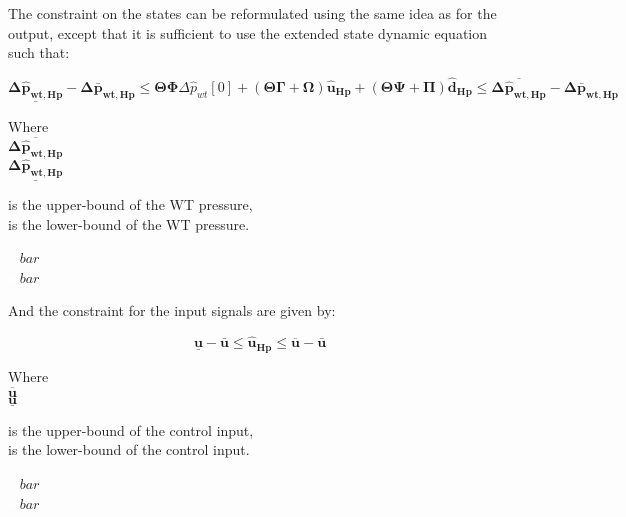 

The constraint on the states can be reformulated using the same idea as for the output, except that it is sufficient to use the extended state dynamic equation such that: 

\begin{equation}
	\underline{\bm{\Delta \hat{p}_{wt,Hp}}} - \bm{\Delta \bar{p}_{wt,Hp}} \leq \bm{\Theta} \bm{\Phi} \Delta \hat{p}_{wt}[0] +  (\bm{\Theta} \bm{\Gamma}+  \bm{\Omega}) \bm{\hat{u}_{Hp}} + (\bm{\Theta} \bm{\Psi} + \bm{\Pi})  \bm{\hat{d}_{Hp}} \leq \overline{\bm{\Delta \hat{p}_{wt,Hp}}} - \bm{\Delta \bar{p}_{wt,Hp}} 
	\label{eq:stateconstraint}
\end{equation}

\begin{minipage}[t]{0.20\textwidth}
Where\\
\hspace*{8mm} $ \overline{\bm{\Delta \hat{p}_{wt,Hp}}} $ \\
\hspace*{8mm} $ \underline{\bm{\Delta \hat{p}_{wt,Hp}}} $ 
\end{minipage}
\begin{minipage}[t]{0.68\textwidth}
\vspace*{2mm}
is the upper-bound of the WT pressure, \\
is the lower-bound of the WT pressure. 
\end{minipage}
\begin{minipage}[t]{0.10\textwidth}
\vspace*{1.8mm}
\textcolor{White}{te}$\unit{bar}$\\
\textcolor{White}{te}$\unit{bar}$
\end{minipage}

And the constraint for the input signals are given by: 

\begin{equation}
\underline{\bm{u}} - \bm{\bar{u}} \leq \bm{\hat{u}_{Hp}} \leq \overline{\bm{{u}}} - \bm{\bar{u}}
\label{eq:inputconstraint}
\end{equation}

\begin{minipage}[t]{0.20\textwidth}
Where\\
\hspace*{8mm} $ \overline{\bm{u}} $ \\
\hspace*{8mm} $ \underline{\bm{u}} $ 
\end{minipage}
\begin{minipage}[t]{0.68\textwidth}
\vspace*{2mm}
is the upper-bound of the control input, \\
is the lower-bound of the control input. 
\end{minipage}
\begin{minipage}[t]{0.10\textwidth}
\vspace*{1.8mm}
\textcolor{White}{te}$\unit{bar}$\\
\textcolor{White}{te}$\unit{bar}$
\end{minipage}


